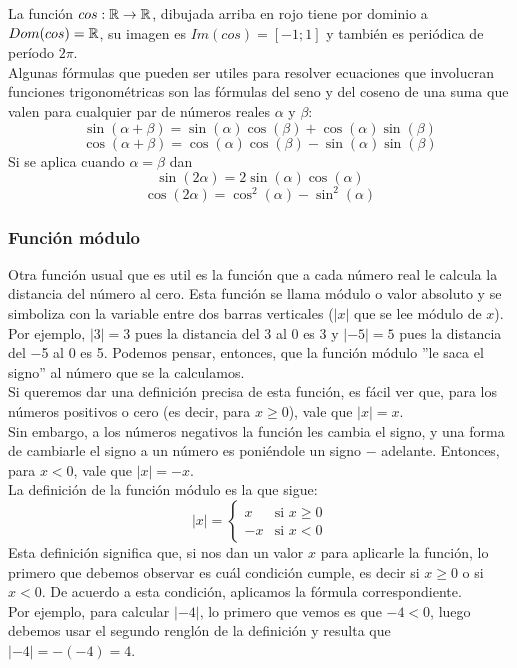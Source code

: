 \documentclass[../Teoría.root.tex]{subfiles}
\begin{document}
La función \(cos:\mathbb{R}\rightarrow\mathbb{R}\), dibujada arriba en rojo tiene por dominio a \(Dom(cos) = \mathbb{R}\), su imagen es \(Im(cos) = [−1; 1]\) y también es periódica de período \(2\pi\).\\
Algunas fórmulas que pueden ser utiles para resolver ecuaciones que involucran funciones trigonométricas son las fórmulas del seno y del coseno de una suma que valen para cualquier par de números reales \(\alpha\) y \(\beta\):
\[\sin(\alpha+\beta)=\sin(\alpha)\cos(\beta)+\cos(\alpha)\sin(\beta)\]
\[\cos(\alpha+\beta)=\cos(\alpha)\cos(\beta)-\sin(\alpha)\sin(\beta)\]
Si se aplica cuando \(\alpha=\beta\) dan
\[\sin(2\alpha)=2\sin(\alpha)\cos(\alpha)\]
\[\cos(2\alpha)=\cos^2(\alpha)-\sin^2(\alpha)\]
\subsubsection{Función módulo}
Otra función usual que es util es la función que a cada número real le calcula la distancia del número al cero.
Esta función se llama módulo o valor absoluto y se simboliza con la variable entre dos barras verticales (\(|x|\) que se lee módulo de \(x\)).\\
Por ejemplo, \(|3| = 3\) pues la distancia del 3 al 0 es 3 y \(|−5| = 5\) pues la distancia del −5 al 0 es 5.
Podemos pensar, entonces, que la función módulo ”le saca el signo” al número que se la calculamos.\\
Si queremos dar una definición precisa de esta función, es fácil ver que, para los números positivos o cero (es decir, para \(x \geq 0\)), vale que \(|x| = x\).\\
Sin embargo, a los números negativos la función les cambia el signo, y una forma de cambiarle el signo a un número es poniéndole un signo \(−\) adelante.
Entonces, para \(x < 0\), vale que \(|x| = −x\).\\
La definición de la función módulo es la que sigue:
\[|x|=
    \begin{cases}
        x  & \text{si }x\geq0 \\
        -x & \text{si }x<0
    \end{cases}
\]
Esta definición significa que, si nos dan un valor \(x\) para aplicarle la función, lo primero que debemos observar es cuál condición cumple, es decir si \(x \geq 0\) o si \(x < 0\).
De acuerdo a esta condición, aplicamos la fórmula correspondiente.\\
Por ejemplo, para calcular \(|−4|\), lo primero que vemos es que \(−4 < 0\), luego debemos usar el segundo renglón de la definición y resulta que \(|−4|=−(−4)=4\).\\
\end{document}
